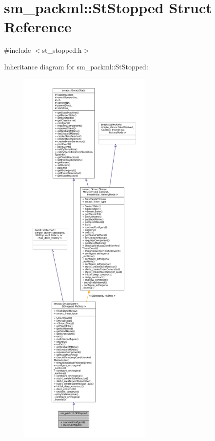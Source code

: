 \hypertarget{structsm__packml_1_1StStopped}{}\section{sm\+\_\+packml\+:\+:St\+Stopped Struct Reference}
\label{structsm__packml_1_1StStopped}


{\ttfamily \#include $<$st\+\_\+stopped.\+h$>$}



Inheritance diagram for sm\+\_\+packml\+:\+:St\+Stopped\+:
\nopagebreak
\begin{figure}[H]
\begin{center}
\leavevmode
\includegraphics[height=550pt]{structsm__packml_1_1StStopped__inherit__graph}
\end{center}
\end{figure}


